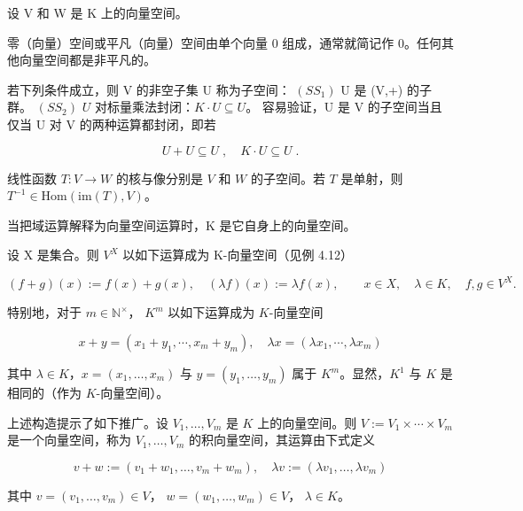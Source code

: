 \begin{example}

设 V 和 W 是 K 上的向量空间。

\begin{items}
\item

零（向量）空间或平凡（向量）空间由单个向量 0 组成，通常就简记作 0。任何其他向量空间都是非平凡的。

\item

若下列条件成立，则 V 的非空子集 U 称为子空间：
$ (SS_{1}) $ U 是 (V,+) 的子群。
$ (SS_{2}) $ $U$ 对标量乘法封闭：$K \cdot U \subseteq U$。
容易验证，U 是 V 的子空间当且仅当 U 对 V 的两种运算都封闭，即若

\[
U+U\subseteq U\;,\quad K\cdot U\subseteq U\;.
\]
\item

线性函数 $T: V \to W$ 的核与像分别是 $V$ 和 $W$ 的子空间。若 $T$ 是单射，则 $T^{-1} \in \mathrm{Hom}(\mathrm{im}(T), V)$。

\item

当把域运算解释为向量空间运算时，K 是它自身上的向量空间。

\item

设 X 是集合。则  $ V^{X} $ 以如下运算成为 K-向量空间（见例 4.12）

\[
(f+g)(x):=f(x)+g(x),\quad(\lambda f)(x):=\lambda f(x),\qquad x\in X,\quad\lambda\in K,\quad f,g\in V^{X}.
\]

特别地，对于  $ m \in \mathbb{N}^\times $， $ K^m $ 以如下运算成为  $ K $-向量空间

\[
x+y=\left(x_{1}+y_{1},\cdots,x_{m}+y_{m}\right),\quad\lambda x=\left(\lambda x_{1},\cdots,\lambda x_{m}\right)
\]

其中 $\lambda \in K$，$x = (x_1, \ldots, x_m)$ 与 $y = (y_1, \ldots, y_m)$ 属于 $K^m$。显然，$K^1$ 与 $K$ 是相同的（作为 $K$-向量空间）。

\item

上述构造提示了如下推广。设 $V_{1},\ldots,V_{m}$ 是 $K$ 上的向量空间。则 $V:=V_{1}\times\cdots\times V_{m}$ 是一个向量空间，称为 $V_{1},\ldots,V_{m}$ 的积向量空间，其运算由下式定义

\[
v+w:=\left(v_{1}+w_{1},\ldots,v_{m}+w_{m}\right),\quad\lambda v:=\left(\lambda v_{1},\ldots,\lambda v_{m}\right)
\]

其中  $ v = (v_1, \ldots, v_m) \in V $， $ w = (w_1, \ldots, w_m) \in V $， $ \lambda \in K $。


\end{items}
\end{example}
